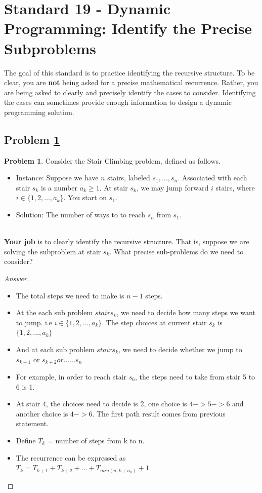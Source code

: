\documentclass[11pt]{article}
\theoremstyle{definition}
\theoremstyle{definition}
\newtheorem{required}{Problem}
\theoremstyle{definition}
\begin{document}
\newpage
\section{Standard 19 - Dynamic Programming: Identify the Precise Subproblems}

\noindent The goal of this standard is to practice identifying the recursive structure. To be clear, you are \textbf{not} being asked for a precise mathematical recurrence. Rather, you are being asked to clearly and precisely identify the cases to consider. Identifying the cases can sometimes provide enough information to design a dynamic programming solution.

\subsection{Problem \ref{DP1}}
\begin{required} \label{DP1}
Consider the \textsf{Stair Climbing} problem, defined as follows.
\begin{itemize}
\item \textsf{Instance:} Suppose we have $n$ stairs, labeled $s_{1}, \ldots, s_{n}$. Associated with each stair $s_{k}$ is a number $a_{k} \geq 1$. At stair $s_{k}$, we may jump forward $i$ stairs, where $i \in \{ 1, 2, \ldots, a_{k}\}$. You start on $s_{1}$.

\item \textsf{Solution:} The number of ways to to reach $s_{n}$ from $s_{1}$.
\end{itemize}

\noindent \\ \textbf{Your job} is to clearly identify the recursive structure. That is, suppose we are solving the subproblem at stair $s_{k}$. What precise sub-problems do we need to consider?
\end{required}

\begin{proof}[Answer]
\begin{itemize}
\item The total steps we need to make is $n-1$ steps.
\item At the each sub problem $stair s_k $, we need to decide how many steps we want to jump. i.e $i \in \{ 1, 2, \ldots, a_{k}\}$.  The step choices at current stair $s_k$ is $\{1,2,...,a_k\}$
\item And at each sub problem $stair s_k $, we need to decide whether we jump to $s_{k+1}$ or $s_{k+2} or ...... s_{n}$
\item For example, in order to reach stair $s_6$, the steps need to take from stair 5  to 6 is 1.
\item At stair $ 4 $, the choices need to decide is 2, one choice is $4 -> 5 ->6$ and another choice is $4 -> 6$. The first path result comes from previous statement.
\item Define $T_k$ = number of steps from k to n.
\item The recurrence can be expressed as $T_k = T_{k+1} + T_{k+2} + ...+ T_{min(n,k+a_k)} + 1$ 
\end{itemize}
\end{proof}
\end{document}

